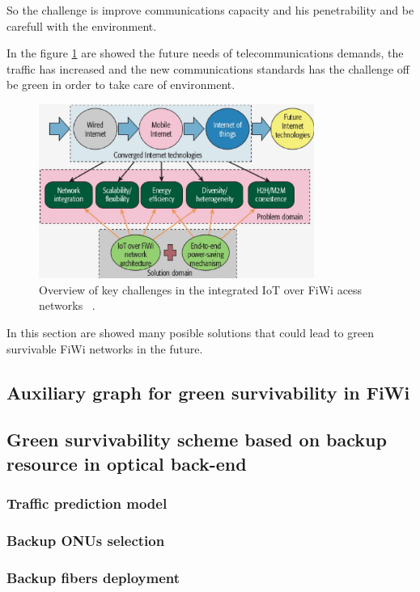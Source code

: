 \documentclass[conference,compsoc]{IEEEtran}
\begin{document}
So the challenge is improve communications capacity and his penetrability and be carefull with the 
environment.

In the figure \ref{fig:fiwi_iot} are showed the future needs of telecommunications demands, the 
traffic has increased and the new communications standards has the challenge off be green in order 
to take care of environment.



\begin{figure}[H]
 	\includegraphics[width=9cm]{future.eps}
 	\caption{Overview of key challenges in the integrated IoT over FiWi 
acess networks ~\cite{iot_fiwi}.}
 	\label{fig:fiwi_iot}
\end{figure}


In this section are showed many posible solutions that could lead to green survivable FiWi networks 
in the future.

\subsection{Auxiliary graph for green survivability in FiWi}

%
\subsection{Green survivability scheme based on backup resource in optical back-end}


\subsubsection{Traffic prediction model}
\subsubsection{Backup ONUs selection}
\subsubsection{Backup fibers deployment}
\end{document}
